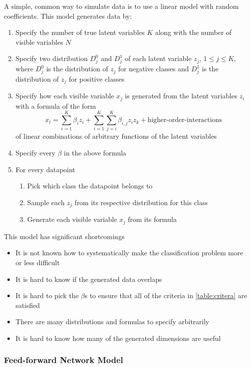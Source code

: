 \documentclass{article}
\begin{document}
A simple, common way to simulate data is to use a linear model with random
coefficients. This model generates data by:
\begin{enumerate}
    \item Specify the number of true latent variables $K$ along with the number
        of visible variables $N$
    \item Specify two distribution $D_j^0$ and $D_j^1$ of each latent variable
        $z_j$, $1 \leq j \leq K$, where $D_j^0$ is the distribution of $z_j$
        for negative classes and $D_j^1$ is the distribution of $z_j$ for
        positive classes
    \item Specify how each visible variable $x_j$ is generated from the latent
        variables $z_i$ with a formula of the form
        $$
        x_l
        = \sum_{i=1}^K \beta_i z_i
        + \sum_{i=1}^K\sum_{j=i}^K \beta_{i,j} z_i z_k
        + \text{higher-order-interactions}
        $$
        of linear combinations of arbitrary functions of the latent variables
    \item Specify every $\beta$ in the above formula
    \item For every datapoint
    \begin{enumerate}
        \item Pick which class the datapoint belongs to
        \item Sample each $z_j$ from its respective distribution for this class
        \item Generate each visible variable $x_j$ from its formula
    \end{enumerate}
\end{enumerate}

This model has significant shortcomings
\begin{itemize}
    \item It is not known how to systematically make the classification problem
        more or less difficult
    \item It is hard to know if the generated data overlaps
    \item It is hard to pick the $\beta$s to ensure that all of the criteria in
        \ref{table:critera} are satisfied
    \item There are many distributions and formulas to specify arbitrarily
    \item It is hard to know how many of the generated dimensions are useful
\end{itemize}


\subsubsection{Feed-forward Network Model}
\end{document}
